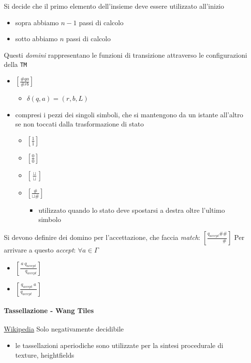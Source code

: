 \documentclass[
                        12pt, %
                        a4paper, %
                        oneside, %
                        headinclude,footinclude, %
                        BCOR5mm, %
                  ]{scrartcl}
\begin{document}
Si decide che il primo elemento dell'insieme deve essere utilizzato all'inizio
\begin{itemize}
\item sopra abbiamo \(n-1\) passi di calcolo
\item sotto abbiamo \(n\) passi di calcolo
\end{itemize}
Questi \emph{domini} rappresentano le funzioni di transizione attraverso le configurazioni della \texttt{TM}
\begin{itemize}
\item \([\frac{\#qa}{\#rb}]\)
\begin{itemize}
\item \(\delta(q,a) = (r,b,L)\)
\end{itemize}
\item compresi i pezzi dei singoli simboli, che si mantengono da un istante all'altro se non toccati dalla trasformazione di stato
\begin{itemize}
\item \([\frac{1}{1}]\)
\item \([\frac{0}{0}]\)
\item \([\frac{\sqcup}{\sqcup}]\)
\item \([\frac{\#}{\sqcup\#}]\)
\begin{itemize}
\item utilizzato quando lo stato deve spostarsi a destra oltre l'ultimo simbolo
\end{itemize}
\end{itemize}
\end{itemize}

Si devono definire dei domino per l'accettazione, che faccia \emph{match}:
\([\frac{q_{accept}\#\#}{\qquad \;\;\;\: \#}]\)
Per arrivare a questo \emph{accept}:
\(\forall a\in \Gamma\)
\begin{itemize}
\item \([\frac{a\: q_{accept}}{\quad q_{accept}}]\)
\item \([\frac{q_{accept} \: a}{q_{accept}\quad}]\)
\end{itemize}
\paragraph{Tassellazione - Wang Tiles}
\label{sec:orgd5e7c28}
\href{https://en.wikipedia.org/wiki/Wang\_tile}{Wikipedia}
Solo negativamente decidibile
\begin{itemize}
\item le tassellazioni aperiodiche sono utilizzate per la sintesi procedurale di texture, heightfields
\end{itemize}
\end{document}
